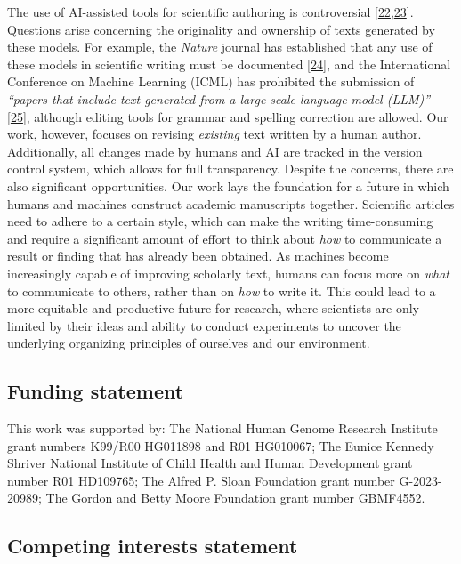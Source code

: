 \documentclass[
]{article}
\begin{document}
The use of AI-assisted tools for scientific authoring is controversial {[}\protect\hyperlink{ref-1EAonKBXJ}{22},\protect\hyperlink{ref-KJTJqmxc}{23}{]}.
Questions arise concerning the originality and ownership of texts generated by these models.
For example, the \emph{Nature} journal has established that any use of these models in scientific writing must be documented {[}\protect\hyperlink{ref-wQLVc4o7}{24}{]}, and the International Conference on Machine Learning (ICML) has prohibited the submission of \emph{``papers that include text generated from a large-scale language model (LLM)''} {[}\protect\hyperlink{ref-K58CKD6D}{25}{]}, although editing tools for grammar and spelling correction are allowed.
Our work, however, focuses on revising \emph{existing} text written by a human author.
Additionally, all changes made by humans and AI are tracked in the version control system, which allows for full transparency.
Despite the concerns, there are also significant opportunities.
Our work lays the foundation for a future in which humans and machines construct academic manuscripts together.
Scientific articles need to adhere to a certain style, which can make the writing time-consuming and require a significant amount of effort to think about \emph{how} to communicate a result or finding that has already been obtained.
As machines become increasingly capable of improving scholarly text, humans can focus more on \emph{what} to communicate to others, rather than on \emph{how} to write it.
This could lead to a more equitable and productive future for research, where scientists are only limited by their ideas and ability to conduct experiments to uncover the underlying organizing principles of ourselves and our environment.

\hypertarget{funding-statement}{%
\subsection{Funding statement}\label{funding-statement}}

This work was supported by:
The National Human Genome Research Institute grant numbers K99/R00 HG011898 and R01 HG010067;
The Eunice Kennedy Shriver National Institute of Child Health and Human Development grant number R01 HD109765;
The Alfred P. Sloan Foundation grant number G-2023-20989;
The Gordon and Betty Moore Foundation grant number GBMF4552.

\hypertarget{competing-interests-statement}{%
\subsection{Competing interests statement}\label{competing-interests-statement}}
\end{document}
